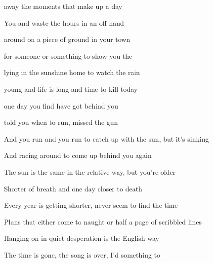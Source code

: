 

\zs
{} away the moments that make up a  day

You  and waste the hours in an off hand 

 around on a piece of ground in your  town

 for someone or something to show you the 
\ks

\zs
{} lying in the sunshine  home to watch the rain

 young and life is long and  time to kill today

 one day you find  have got behind you

 told you when to run,  missed the  gun
\ks

\zs
And you run and you run to catch up with the sun, but it's sinking

And racing around to come up behind you again

The sun is the same in the relative way, but you're older

Shorter of breath and one day closer to death
\ks

\zs
Every year is getting shorter, never seem to find the time

Plans that either come to naught or half a page of scribbled lines

Hanging on in quiet desperation is the English way

The time is gone, the song is over,  I'd something  to 
\ks

\kp





